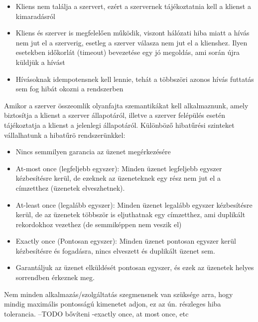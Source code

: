 \documentclass[a4paper,12pt]{article}
\begin{document}
\begin{itemize}
\item Kliens nem találja a szervert, ezért a szervernek tájékoztatnia kell a klienst a kimaradásról
\item Kliens és szerver is megfelelően működik, viszont hálózati hiba miatt a hívás nem jut el a szerverig, esetleg a szerver válasza nem jut el a klienshez. Ilyen esetekben időkorlát (timeout) bevezetése egy jó megoldás, ami során újra küldjük a hívást
\item Hívásoknak idempotensnek kell lennie, tehát a többszöri azonos hívás futtatás sem fog hibát okozni a rendszerben
\end{itemize}

Amikor a szerver összeomlik olyanfajta szemantikákat kell alkalmaznunk, amely biztosítja a klienst a szerver állapotáról, illetve a szerver felépülés esetén tájékoztatja a klienst a jelenlegi állapotáról. \linebreak
Különböző hibatűrési szinteket vállalhatunk a hibatűrö rendszerünkkel: ~\cite{akka}

\begin{itemize}
\item Nincs semmilyen garancia az üzenet megérkezésére
\item At-most once (legfeljebb egyszer): Minden üzenet legfeljebb egyszer kézbesítésre kerül, de ezeknek az üzeneteknek egy rész nem jut el a címzetthez (üzenetek elveszhetnek).
\item At-least once (legalább egyszer): Minden üzenet legalább egyszer kézbesítésre kerül, de az üzenetek többször is eljuthatnak egy címzetthez, ami duplikált rekordokhoz vezethez (de semmiképpen nem veszik el)
\item Exactly once (Pontosan egyszer): Minden üzenet pontosan egyszer kerül kézbesítésre és fogadásra, nincs elveszett és duplikált üzenet sem.
\item Garantáljuk az üzenet elküldését pontosan egyszer, és ezek az üzenetek helyes sorrendben érkeznek meg.
\end{itemize}

Nem minden alkalmazás/szolgáltatás szegmensnek van szüksége arra, hogy mindig maximális pontosságú kimenetet adjon, ez az ún. részleges hiba tolerancia. 
--TODO bővíteni
-exactly once, at most once, etc
\end{document}
